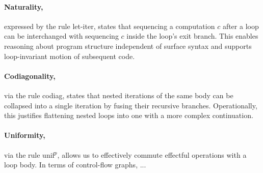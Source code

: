 \documentclass[acmsmall,screen,review]{acmart}
\newcommand{\ms}[1]{\ensuremath{\mathsf{#1}}}
\newcommand{\lto}{:}
\newcommand{\linl}[1]{\iota_l\;{#1}}
\newcommand{\linr}[1]{\iota_r\;{#1}}
\newcommand{\letexpr}[3]{\ensuremath{\ms{let}\;#1 = #2;\;#3}}
\newcommand{\caseexpr}[5]{\ms{case}\;#1\;\{\linl{#2} \lto #3, \linr{#4} \lto #5\}}
\newcommand{\liter}[3]{\ms{iter}\;#1\;\{ \linr{#2} \lto #3 \}}
\newcommand{\tref}{\twoheadrightarrow}
\newcommand{\antitref}{\twoheadleftarrow}
\begin{document}
\paragraph{Naturality,} expressed by the rule \textsf{let-iter}, states that sequencing a
computation $c$ after a loop can be interchanged with sequencing $c$ inside the loop’s exit branch.
This enables reasoning about program structure independent of surface syntax and supports
loop-invariant motion of subsequent code.
%
\paragraph{Codiagonality,} via the rule \textsf{codiag}, states that nested iterations of the same
body can be collapsed into a single iteration by fusing their recursive branches. Operationally,
this justifies flattening nested loops into one with a more complex continuation.
%
\paragraph{Uniformity,} via the rule \textsf{unif$^p$}, allows us to effectively commute effectful
operations with a loop body. In terms of control-flow graphs, ...

\end{document}
